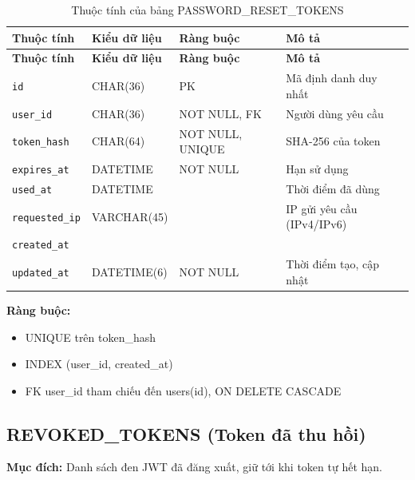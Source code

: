 {\small
\begin{longtable}{|P{3.2cm}|P{2.8cm}|P{2.2cm}|p{5.4cm}|}
    \caption{Thuộc tính của bảng PASSWORD\_\allowbreak{}RESET\_\allowbreak{}TOKENS}
    \label{tab:password_reset_tokens} \\
    \hline
    \textbf{Thuộc tính} & \textbf{Kiểu dữ liệu} & \textbf{Ràng buộc} & \textbf{Mô tả} \\
    \hline
    \endfirsthead
    \hline
    \textbf{Thuộc tính} & \textbf{Kiểu dữ liệu} & \textbf{Ràng buộc} & \textbf{Mô tả} \\
    \hline
    \endhead

    \texttt{id} & CHAR(36) & PK & Mã định danh duy nhất \\
    \hline
    \texttt{user\_\allowbreak{}id} & CHAR(36) & NOT NULL, FK & Người dùng yêu cầu \\
    \hline
    \texttt{token\_\allowbreak{}hash} & CHAR(64) & NOT NULL, UNIQUE & SHA-256 của token \\
    \hline
    \texttt{expires\_\allowbreak{}at} & DATETIME & NOT NULL & Hạn sử dụng \\
    \hline
    \texttt{used\_\allowbreak{}at} & DATETIME &  & Thời điểm đã dùng \\
    \hline
    \texttt{requested\_\allowbreak{}ip} & VARCHAR(45) &  & IP gửi yêu cầu (IPv4/IPv6) \\
    \hline
    \texttt{created\_\allowbreak{}at} &  &  &  \\
    \hline
    \texttt{updated\_\allowbreak{}at} & DATETIME(6) & NOT NULL & Thời điểm tạo, cập nhật \\
    \hline
\end{longtable}
}

\textbf{Ràng buộc:}
\begin{itemize}
    \item UNIQUE trên token\_\allowbreak{}hash
    \item INDEX (user\_\allowbreak{}id, created\_\allowbreak{}at)
    \item FK user\_\allowbreak{}id tham chiếu đến users(id), ON DELETE CASCADE
\end{itemize}

\subsection{REVOKED\_\allowbreak{}TOKENS (Token đã thu hồi)}

\textbf{Mục đích:} Danh sách đen JWT đã đăng xuất, giữ tới khi token tự hết hạn.

